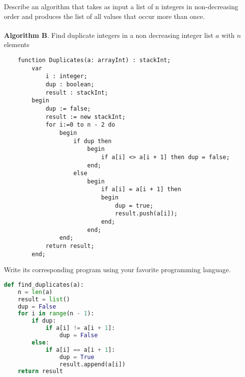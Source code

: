 \documentclass[12pt]{article}
\newenvironment{problem}[2][Problem]{\begin{trivlist}
\item[\hskip \labelsep {\bfseries #1}\hskip \labelsep {\bfseries #2.}]}{\end{trivlist}}
\begin{document}
\begin{problem}{2}
Describe an algorithm that takes as input a list of n integers in non-decreasing order
and produces the list of all values that occur more than once.
\\\\
\textbf{Algorithm B}. Find duplicate integers in a non decreasing integer list $a$ with $n$ elements
\begin{verbatim}
    function Duplicates(a: arrayInt) : stackInt;
        var
            i : integer;
            dup : boolean;
            result : stackInt;
        begin
            dup := false;
            result := new stackInt;
            for i:=0 to n - 2 do
                begin
                    if dup then
                        begin
                            if a[i] <> a[i + 1] then dup = false;
                        end;
                    else
                        begin
                            if a[i] = a[i + 1] then
                            begin
                                dup = true;
                                result.push(a[i]);
                            end;
                        end;
                end;
            return result;
        end;
\end{verbatim}
Write its corresponding program using your favorite programming language.\\

\begin{lstlisting}[language=Python, caption=Duplicate Integers]
def find_duplicates(a):
    n = len(a)
    result = list()
    dup = False
    for i in range(n - 1):
        if dup:
            if a[i] != a[i + 1]:
                dup = False
        else:
            if a[i] == a[i + 1]:
                dup = True
                result.append(a[i])
    return result

\end{lstlisting}

\end{problem}
\end{document}
